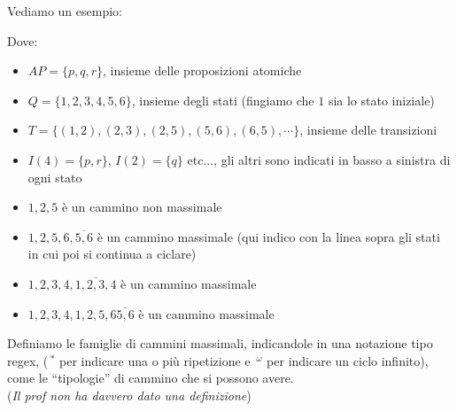 \documentclass[a4paper,12pt, oneside]{book}
\begin{document}
\begin{esempio}
  Vediamo un esempio:
  \begin{figure}[H]
    \centering
  \end{figure}
  Dove:
  \begin{itemize}
    \item $AP=\{p, q, r\}$, insieme delle proposizioni atomiche
    \item $Q=\{1,2,3,4,5,6\}$, insieme degli stati (fingiamo che $1$ sia lo
    stato iniziale)
    \item $T=\{(1,2),(2,3),(2,5),(5,6),(6,5),\cdots\}$, insieme delle
    transizioni 
    \item $I(4) =\{p, r\}$, $I(2) =\{q\}$ etc$\ldots$, gli altri sono indicati
    in basso a sinistra di ogni stato
    \item $1,2,5$ è un cammino non massimale
    \item $1,2,5,6,\overline{5,6}$ è un cammino massimale (qui indico con la
    linea sopra gli stati in cui poi si continua a ciclare)
    \item $1,2,3,4,\overline{1,2,3,4}$ è un cammino massimale
    \item $1,2,3,4,1,2,5,6\overline{5,6}$ è un cammino massimale
  \end{itemize}
\end{esempio}
\begin{definizione}
  Definiamo le famiglie di cammini massimali, indicandole in una notazione tipo
  regex, ($\,^*$ per indicare una o più ripetizione e $\,^\omega$ per indicare
  un ciclo infinito), come le ``tipologie'' di cammino che si possono avere.\\
  (\textit{Il prof non ha davvero dato una definizione})
\end{definizione}
\end{document}
